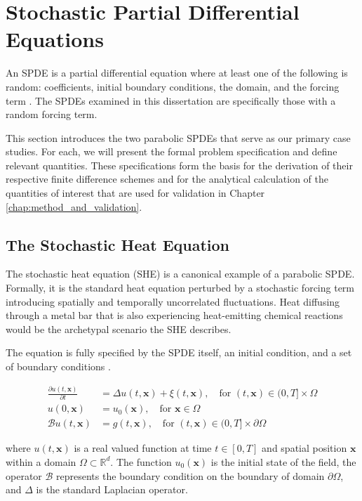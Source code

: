 \section{Stochastic Partial Differential Equations}

An SPDE is a partial differential equation
where at least one of the following is random: coefficients, 
initial boundary conditions, the domain, and the forcing term 
\cite{lototsky2017stochastic}. The SPDEs examined in this dissertation
are specifically those with a random forcing term.

This section introduces the two parabolic SPDEs that 
serve as our primary case studies. For each, we 
will present the formal problem specification and define relevant 
quantities. These specifications form the basis for the derivation
of their respective finite difference schemes and for the analytical 
calculation of the quantities of interest that are used for 
validation in Chapter \ref{chap:method_and_validation}.

\subsection{The Stochastic Heat Equation}

The stochastic heat equation (SHE) is a canonical example of a parabolic SPDE.
Formally, it is the standard heat equation perturbed by a stochastic
forcing term introducing spatially and temporally uncorrelated 
fluctuations. Heat diffusing through a metal bar 
that is also experiencing heat-emitting chemical reactions would be the archetypal
scenario the SHE describes.

The equation is fully specified by the SPDE itself, an initial condition, and 
a set of boundary conditions \cite{lototsky2017stochastic,pardoux2021stochastic}.

\begin{align}\label{eq:she_spde}
\frac{\partial u(t,\mathbf{x})}{\partial t} &= \Delta u(t,\mathbf{x}) + \xi(t,\mathbf{x}), 
\quad \text{for } (t, \mathbf{x}) \in (0, T] \times \Omega \tag{SHE} \\
u(0, \mathbf{x}) &= u_0(\mathbf{x}), \quad \text{for } \mathbf{x} \in \Omega \nonumber \\
\mathcal{B}u(t, \mathbf{x}) &= g(t, \mathbf{x}), \quad \text{for } 
(t, \mathbf{x}) \in (0, T] \times \partial \Omega \nonumber
\end{align}

where $u(t,\mathbf{x})$ is a real valued function at time $t \in [0, T]$ and 
spatial position $\mathbf{x}$ within a domain $\Omega \subset \mathbb{R}^d$. 
The function $u_0(\mathbf{x})$ is the initial state of the field,
the operator $\mathcal{B}$ represents the boundary condition on the boundary of domain 
$\partial \Omega$, and $\Delta$ is the standard Laplacian operator.

